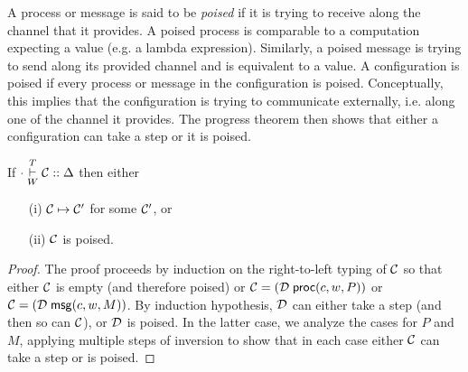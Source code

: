 A process or message is said to be \emph{poised} if it is trying to
receive along the channel that it provides.  A poised process is
comparable to a computation expecting a value (e.g. a lambda expression).
Similarly, a poised message is trying to send along its provided channel and is equivalent to a value.
A configuration is poised if every process or message in the configuration is poised.
Conceptually, this implies that the configuration is trying to communicate
externally, i.e. along one of the channel it provides.
The progress theorem then shows that either a configuration can take a
step or it is poised.

\begin{theorem}
\label{thm:progress}
\mbox{}
If $\cdot \overset{T}{\underset{W}{\vdash}} \mathcal{C} :: \Delta$ then either
\begin{enumerate}
\item[(i)] $\mathcal{C} \mapsto \mathcal{C}'$ for some $\mathcal{C}'$, or
\item[(ii)] $\mathcal{C}$ is poised.
\end{enumerate}
\end{theorem}
\begin{proof}
The proof proceeds by induction on the right-to-left typing of $\mathcal{C}$ so that either
$\mathcal{C}$ is empty (and therefore poised) or
$\mathcal{C} = (\mathcal{D}\; \mathsf{proc}(c, w, P))$ or
$\mathcal{C} = (\mathcal{D}\; \mathsf{msg}(c, w, M))$. By induction hypothesis, $\mathcal{D}$ can
either take a step (and then so can $\mathcal{C}$), or $\mathcal{D}$ is poised.  In
the latter case, we analyze the cases for $P$ and $M$, applying multiple steps of
inversion to show that in each
case either $\mathcal{C}$ can take a step or is poised.
\end{proof}

%


